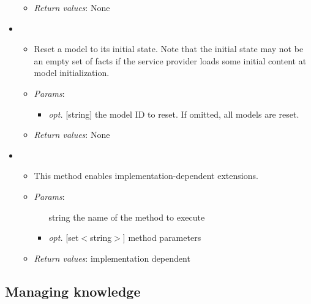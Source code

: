 \begin{itemize}
\begin{itemize}
\item  \emph{Return values}: None
\end{itemize}

\item  {}
\begin{itemize}
\item  Reset a model to its initial state. Note that the initial state may not be an empty set of facts if the service provider loads some initial content at model initialization.
\item  \emph{Params}:
\begin{itemize}
\item  \emph{opt.} [string] the model ID to reset. If omitted, all models are reset. 
\end{itemize}

\item  \emph{Return values}: None
\end{itemize}

\item  {}
\begin{itemize}
\item  This method enables implementation-dependent extensions.
\item  \emph{Params}:
\begin{itemize}
\item  [string] the name of the method to execute
\item  \emph{opt.} [set$<$string$>$] method parameters
\end{itemize}

\item  \emph{Return values}: implementation dependent
\end{itemize}

\end{itemize}

\subsection{Managing knowledge}



